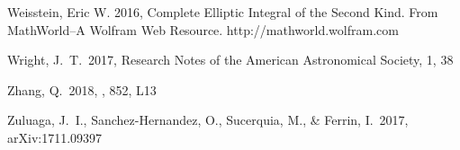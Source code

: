 \documentclass[a4paper,fleqn,usenatbib]{mnras}
\begin{document}
\begin{thebibliography}{99}
 Weisstein, Eric W. 2016, Complete Elliptic Integral of the Second Kind. From MathWorld--A Wolfram Web Resource. http://mathworld.wolfram.com

 Wright, J.~T.\ 2017, Research Notes of the American Astronomical Society, 1, 38 

 Zhang, Q.\ 2018, \apjl, 852, L13

 Zuluaga, J.~I., Sanchez-Hernandez, O., Sucerquia, M., \& Ferrin, I.\ 2017, arXiv:1711.09397

\end{thebibliography}


\bsp	%
\label{lastpage}
\end{document}
